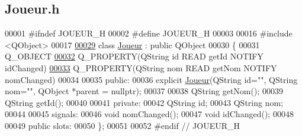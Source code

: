 \hypertarget{_joueur_8h_source}{}\subsection{Joueur.\+h}
\label{_joueur_8h_source}

\begin{DoxyCode}
00001 \textcolor{preprocessor}{#ifndef JOUEUR\_H}
00002 \textcolor{preprocessor}{#define JOUEUR\_H}
00003 
00016 \textcolor{preprocessor}{#include <QObject>}
00017 
\hyperlink{class_joueur}{00029} \textcolor{keyword}{class }\hyperlink{class_joueur}{Joueur} : \textcolor{keyword}{public} QObject
00030 \{
00031     Q\_OBJECT
\hyperlink{class_joueur_a99c42cd3be344a1348064aca8619c82b}{00032}     Q\_PROPERTY(QString \textcolor{keywordtype}{id} READ getId NOTIFY idChanged)
\hyperlink{class_joueur_ab06d7f1e6b482299bb03919e0cd2166d}{00033}     Q\_PROPERTY(QString nom READ getNom NOTIFY nomChanged)
00034 
00035 public:
00036     explicit \hyperlink{class_joueur}{Joueur}(QString \textcolor{keywordtype}{id}="", QString nom="", QObject *parent = \textcolor{keywordtype}{nullptr});
00037 
00038     QString getNom();
00039     QString getId();
00040 
00041 private:
00042     QString \textcolor{keywordtype}{id};
00043     QString nom;
00044 
00045 signals:
00046     \textcolor{keywordtype}{void} nomChanged();
00047     \textcolor{keywordtype}{void} idChanged();
00048 
00049 public slots:
00050 \};
00051 
00052 \textcolor{preprocessor}{#endif // JOUEUR\_H}
\end{DoxyCode}
